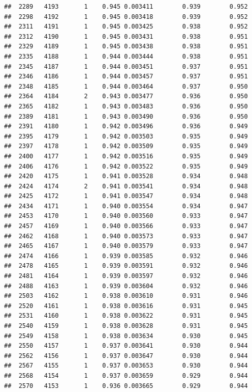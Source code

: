 \documentclass[
]{book}
\begin{document}
\begin{verbatim}
##  2289   4193       1    0.945 0.003411        0.939        0.952
##  2298   4192       1    0.945 0.003418        0.939        0.952
##  2311   4191       1    0.945 0.003425        0.938        0.952
##  2312   4190       1    0.945 0.003431        0.938        0.951
##  2329   4189       1    0.945 0.003438        0.938        0.951
##  2335   4188       1    0.944 0.003444        0.938        0.951
##  2345   4187       1    0.944 0.003451        0.937        0.951
##  2346   4186       1    0.944 0.003457        0.937        0.951
##  2348   4185       1    0.944 0.003464        0.937        0.950
##  2364   4184       2    0.943 0.003477        0.936        0.950
##  2365   4182       1    0.943 0.003483        0.936        0.950
##  2389   4181       1    0.943 0.003490        0.936        0.950
##  2391   4180       1    0.942 0.003496        0.936        0.949
##  2395   4179       1    0.942 0.003503        0.935        0.949
##  2397   4178       1    0.942 0.003509        0.935        0.949
##  2400   4177       1    0.942 0.003516        0.935        0.949
##  2406   4176       1    0.942 0.003522        0.935        0.949
##  2420   4175       1    0.941 0.003528        0.934        0.948
##  2424   4174       2    0.941 0.003541        0.934        0.948
##  2425   4172       1    0.941 0.003547        0.934        0.948
##  2434   4171       1    0.940 0.003554        0.934        0.947
##  2453   4170       1    0.940 0.003560        0.933        0.947
##  2457   4169       1    0.940 0.003566        0.933        0.947
##  2462   4168       1    0.940 0.003573        0.933        0.947
##  2465   4167       1    0.940 0.003579        0.933        0.947
##  2474   4166       1    0.939 0.003585        0.932        0.946
##  2478   4165       1    0.939 0.003591        0.932        0.946
##  2481   4164       1    0.939 0.003597        0.932        0.946
##  2488   4163       1    0.939 0.003604        0.932        0.946
##  2503   4162       1    0.938 0.003610        0.931        0.946
##  2520   4161       1    0.938 0.003616        0.931        0.945
##  2531   4160       1    0.938 0.003622        0.931        0.945
##  2540   4159       1    0.938 0.003628        0.931        0.945
##  2549   4158       1    0.938 0.003634        0.930        0.945
##  2550   4157       1    0.937 0.003641        0.930        0.944
##  2562   4156       1    0.937 0.003647        0.930        0.944
##  2567   4155       1    0.937 0.003653        0.930        0.944
##  2568   4154       1    0.937 0.003659        0.929        0.944
##  2570   4153       1    0.936 0.003665        0.929        0.944

\end{verbatim}
\end{document}
